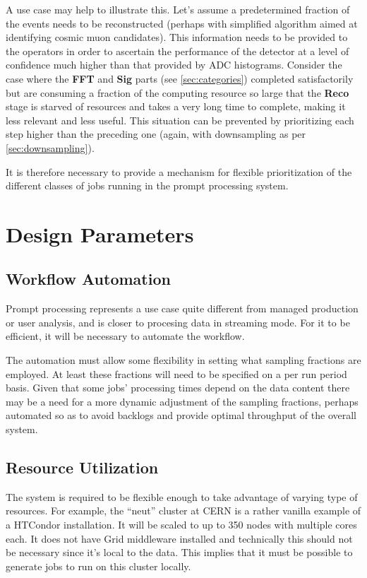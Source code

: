 \documentclass[pdftex,12pt,letter]{article}
\begin{document}
A use case may help to illustrate this. Let's assume a predetermined fraction of the events needs to
be reconstructed (perhaps with simplified algorithm aimed at identifying cosmic muon candidates).
This information needs to be provided to the operators in order to ascertain the performance
of the detector at a level of confidence much higher than that provided by ADC histograms.
Consider the case where the \textbf{FFT} and \textbf{Sig} parts (see \ref{sec:categories})
completed satisfactorily but are consuming a fraction of the computing resource so large that
the  \textbf{Reco} stage is starved of resources and takes a very long time to complete, making
it less relevant and less useful. This situation can be prevented by prioritizing each step higher
than the preceding one (again, with downsampling as per \ref{sec:downsampling}).

It is therefore necessary to provide a mechanism for flexible prioritization of the different
classes of jobs running in the prompt processing system.

\section{Design Parameters}

\subsection{Workflow Automation}

Prompt processing represents a use case quite different from managed production or user analysis, and is closer to
procesing data in streaming mode. For it to be efficient, it will be necessary to automate the workflow.

The automation must allow some flexibility in setting what
sampling fractions are employed.  At least these
fractions will need to be specified on a per run period basis.  Given
that some jobs' processing times depend on the data content there may
be a need for a more dynamic adjustment of the sampling fractions, perhaps
automated so as to avoid backlogs and provide optimal throughput of the
overall system.

\subsection{Resource Utilization}
The system is required to be flexible enough to take advantage of varying type of resources. For example, the ``neut'' cluster at CERN
is a rather vanilla example of a HTCondor installation. It will be scaled to up to 350 nodes with multiple cores each. It does not have Grid middleware
installed and technically this should not be necessary since it's local to the data. This implies that it must be possible to generate jobs to
run on this cluster locally.
\end{document}
